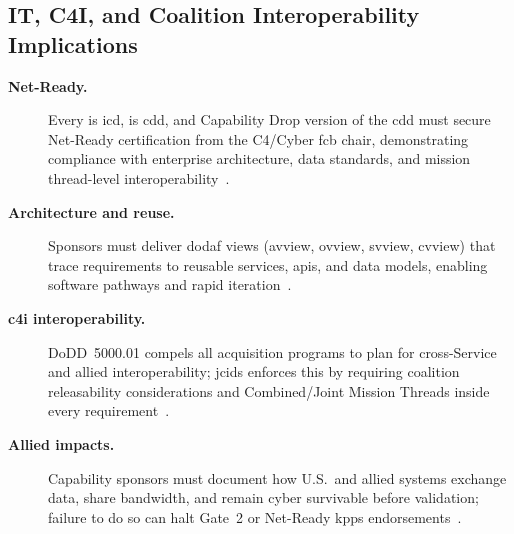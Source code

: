 \documentclass[../main.tex]{subfiles}
\begin{document}
\subsection{IT, C4I, and Coalition Interoperability Implications}
\begin{description}
  \item[\textbf{Net-Ready.}] Every \ac{is} \ac{icd}, \ac{is} \ac{cdd}, and Capability Drop version of the \ac{cdd} must secure Net-Ready certification from the C4/Cyber \ac{fcb} chair, demonstrating compliance with enterprise architecture, data standards, and mission thread-level interoperability~\autocite{jcids-manual-2021}.
  \item[\textbf{Architecture and reuse.}] Sponsors must deliver \ac{dodaf} views (\ac{avview}, \ac{ovview}, \ac{svview}, \ac{cvview}) that trace requirements to reusable services, \acp{api}, and data models, enabling software pathways and rapid iteration~\autocite{jcids-manual-2021,DoDI5000-02}.
  \item[\textbf{\ac{c4i} interoperability.}] DoDD~5000.01 compels all acquisition programs to plan for cross-Service and allied interoperability; \ac{jcids} enforces this by requiring coalition releasability considerations and Combined/Joint Mission Threads inside every requirement~\autocite{DoDD5000-01}.
  \item[\textbf{Allied impacts.}] Capability sponsors must document how U.S.\ and allied systems exchange data, share bandwidth, and remain cyber survivable before validation; failure to do so can halt Gate~2 or Net-Ready \acp{kpp} endorsements~\autocite{jcids-manual-2021,edo-3-3-3-jcids-2025}.
\end{description}
\end{document}
